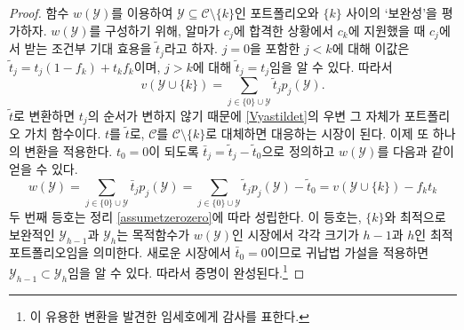 \documentclass[11pt]{article} %
\newif\ifen
\theoremstyle{definition}
\theoremstyle{definition}
\begin{document}
\begin{proof}
\ifen We will use the function $w(\mathcal{Y})$ to grade portfolios $\mathcal{Y} \subseteq \mathcal{C} \setminus \{k\}$ according to how well they complement $\{k\}$. To construct $w(\mathcal{Y})$, let $\tilde t_j$ denote the expected utility Alma receives from school $c_j$ \emph{given} that she has been admitted to $c_j$ and applied to $c_k$. For $j < k$, including $j = 0$, this is $\tilde t_j = (1- f_k) t_j + f_k t_k$; for $j > k $, this is $\tilde t_j = t_j$. This means that 
\else 함수 $w(\mathcal{Y})$를 이용하여 $\mathcal{Y} \subseteq \mathcal{C} \setminus \{k\}$인 포트폴리오와 $\{k\}$ 사이의 \mbox{`보완성'을} 평가하자. $w(\mathcal{Y})$를 구성하기 위해, 알마가 $c_j$에 합격한 상황에서 $c_k$에 지원했을 때 $c_j$에서 받는 조건부 기대 효용을 $\tilde t_j$라고 하자. $j = 0$을 포함한 $j < k$에 대해 이값은 $\tilde t_j = t_j (1- f_k) + t_k f_k$이며, $j > k $에 대해 $\tilde t_j = t_j$임을 알 수 있다. 따라서 \fi
\begin{equation}\label{Vyastildet}
v(\mathcal{Y}\cup\{k\}) = \sum_{j \in \{0\} \cup \mathcal{Y}} \tilde t_j p_j(\mathcal{Y}).\end{equation}
\ifen The transformation to $\tilde t$ does not change the order of the $t_j$-values. Therefore, the expression on the right side of \eqref{Vyastildet} is itself a portfolio valuation function. In the corresponding market, $t$ is replaced by $\tilde t$ and $\mathcal{C}$ is replaced by $\mathcal{C}\setminus\{k\}$. Now, we obtain $w(\mathcal{Y})$ through one more transformation: Define $\bar t_j = \tilde t_j - \tilde t_0$ so that $t_0 = 0$ and let
\else $\tilde t$로 변환하면 $t_j$의 순서가 변하지 않기 때문에 \eqref{Vyastildet}의 우변 그 자체가 포트폴리오 가치 함수이다. $t$를 $\tilde t$로, $\mathcal{C}$를 $\mathcal{C}\setminus \{k\}$로 대체하면 대응하는 시장이 된다. 이제 또 하나의 변환을 적용한다. $t_0 = 0$이 되도록 $\bar t_j = \tilde t_j - \tilde t_0$으로 정의하고 $w(\mathcal{Y})$를 다음과 같이 얻을 수 있다. \fi
\begin{equation}  \label{wYvXminusconst}
w(\mathcal{Y})
= \sum_{j \in \{0\} \cup \mathcal{Y}} \bar t_j p_j(\mathcal{Y})
= \sum_{j \in \{0\} \cup \mathcal{Y}} \tilde t_j p_j(\mathcal{Y})- \tilde t_0
= v(\mathcal{Y}\cup\{k\}) -  f_k t_k \end{equation}
\ifen where the second equality follows from Theorem \ref{assumetzerozero}. This identity says that the optimal complements to $\{k\}$, given by $\mathcal{Y}_{h-1}$ and $\mathcal{Y}_h$, are themselves optimal portfolios of size $h-1$ and $h$ for the market whose objective function is $w(\mathcal{Y})$. Since $\bar t_0 = 0$ in the latter market, the inductive hypothesis implies that $\mathcal{Y}_{h-1} \subset \mathcal{Y}_h$, which completes the proof.\footnote{We thank Yim Seho for discovering this useful transformation.}
\else 두 번째 등호는 정리 \ref{assumetzerozero}에 따라 성립한다. 이 등호는, $\{k\}$와 최적으로 보완적인 $\mathcal{Y}_{h-1}$과 $\mathcal{Y}_h$는 목적함수가 $w(\mathcal{Y})$인 시장에서 각각 크기가 $h-1$과 $h$인 최적 포트폴리오임을 의미한다. 새로운 시장에서 $\bar t_0 = 0$이므로 귀납법 가설을 적용하면 $\mathcal{Y}_{h-1} \subset \mathcal{Y}_h$임을 알 수 있다. 따라서 증명이 완성된다.\footnote{이 유용한 변환을 발견한 임세호에게 감사를 표한다.} \fi
\end{proof}
\end{document}
